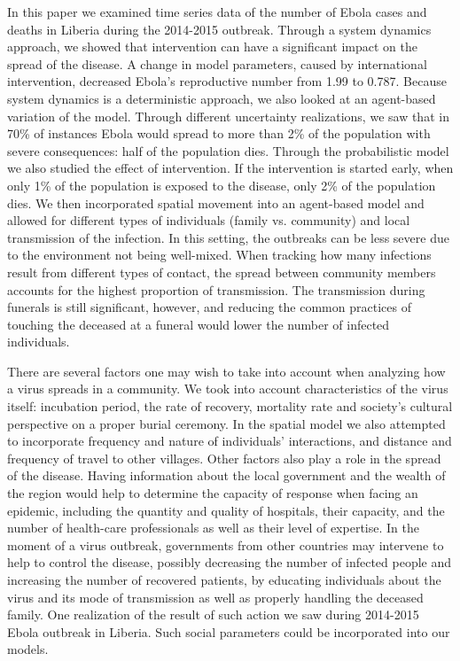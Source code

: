 In this paper we examined time series data of the number of Ebola cases and deaths in Liberia during the 2014-2015 outbreak. Through a system dynamics approach, we showed that intervention can have a significant impact on the spread of the disease. A change in model parameters, caused by international intervention, decreased Ebola's reproductive number from 1.99 to 0.787. Because system dynamics is a deterministic approach, we also looked at an agent-based variation of the model. Through different uncertainty realizations, we saw that in 70\% of instances Ebola would spread to more than 2\% of the population with severe consequences: half of the population dies. Through the probabilistic model we also studied the effect of intervention. If the intervention is started early, when only 1\% of the population is exposed to the disease, only 2\% of the population dies. We then incorporated spatial movement into an agent-based model and allowed for different types of individuals (family vs. community) and local transmission of the infection. In this setting, the outbreaks can be less severe due to the environment not being well-mixed. When tracking how many infections result from different types of contact, the spread between community members accounts for the highest proportion of transmission. The transmission during funerals is still significant, however, and reducing the common practices of touching the deceased at a funeral would lower the number of infected individuals.

There are several factors one may wish to take into account when analyzing how a virus spreads in a community. We took into account characteristics of the virus itself: incubation period, the rate of recovery, mortality rate and society's cultural perspective on a proper burial ceremony. In the spatial model we also attempted to incorporate frequency and nature of individuals' interactions, and distance and frequency of travel to other villages. Other factors also play a role in the spread of the disease. Having information about the local government and the wealth of the region would help to determine the capacity of response when facing an epidemic, including the quantity and quality of hospitals, their capacity, and the number of health-care professionals as well as their level of expertise. In the moment of a virus outbreak, governments from other countries may intervene to help to control the disease, possibly decreasing the number of infected people and increasing the number of recovered patients, by educating individuals about the virus and its mode of transmission as well as properly handling the deceased family. One realization of the result of such action we saw during 2014-2015 Ebola outbreak in Liberia. Such social parameters could be incorporated into our models.